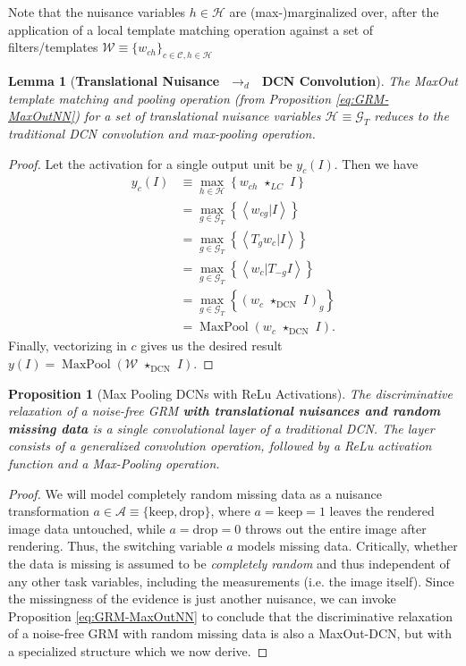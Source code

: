 \documentclass[12pt]{article}
\newtheorem{lemma}[theorem]{Lemma}
\newtheorem{proposition}[theorem]{Proposition}
\newcommand{\Cl}[0]{{ \mathcal{C} }}
\newcommand{\G}[0]{{ \mathcal{G} }}
\newcommand{\HH}[0]{{ \mathcal{H} }}
\newcommand{\A}[0]{{ \mathcal{A} }}
\newcommand{\W}[0]{{ \mathcal{W} }}
\newcommand{\drelax}[0]{{ \,\,\rightarrow_{d}\,\, }}
\newcommand{\lcmatch}[0]{{ \,\,\star_{LC}\,\, }}
\newcommand{\cnnconv}[0]{{ \,\,\star_{\textrm{DCN}}\,\, }}
\DeclareMathOperator*{\MaxPool}{MaxPool}
\begin{document}
Note that the nuisance variables $h \in \HH$ are (max-)marginalized over, after the application of a local template matching operation against a set of filters/templates $\W \equiv \{ w_{ch} \}_{c \in \Cl, h \in \HH}$\begin{lemma}[\textbf{Translational Nuisance $\drelax$ DCN Convolution}] 
\label{lem:trans-to-dcn-conv}
 The MaxOut template matching and pooling operation (from Proposition \ref{eq:GRM-MaxOutNN}) for a set of translational nuisance variables $\HH \equiv \G_{T}$ reduces to the traditional DCN convolution and max-pooling operation.
\end{lemma}\begin{proof}
 Let the activation for a single output unit be $y_{c}(I)$. Then we have
 \begin{align*} 
    y_{c}(I) &\equiv  \max_{h \in \HH}  \left\{ w_{ch} \lcmatch I \right\}   \\
                &=  \max_{g \in \G_{T}}  \left\{ \left< w_{cg} | I \right> \right\}  \\
                &=  \max_{g \in \G_{T}}  \left\{ \left< T_{g} w_{c} | I \right> \right\}  \\
                &=  \max_{g \in \G_{T}}  \left\{ \left< w_{c} | T_{-g} I \right> \right\}  \\
                &=  \max_{g \in \G_{T}}  \left\{ (w_{c} \cnnconv I)_{g} \right\}  \\
                &=  \MaxPool( w_{c} \cnnconv I).
 \end{align*}
 Finally, vectorizing in $c$ gives us the desired result $y(I) = \MaxPool( \W \cnnconv I)$.
\end{proof}\begin{proposition}[Max Pooling DCNs with ReLu Activations] \label{prop:detailedReLuProof}
The discriminative relaxation of a noise-free GRM \textbf{with translational nuisances and random missing data} is a single convolutional layer of a traditional DCN. The layer consists of a generalized convolution operation, followed by a ReLu activation function and a Max-Pooling operation.
\end{proposition}\begin{proof}
We will model completely random missing data as a nuisance transformation $a \in \A \equiv \{\textrm{keep}, \textrm{drop} \}$, where $a=\textrm{keep}=1$ leaves the rendered image data untouched, while $a=\textrm{drop}=0$ throws out the entire image after rendering. Thus, the switching variable $a$ models missing data. Critically, whether the data is missing is assumed to be \textit{completely random}  and thus independent of any other task variables, including the measurements (i.e. the image itself). Since the missingness of the evidence is just another nuisance, we can invoke Proposition \ref{eq:GRM-MaxOutNN} to conclude that the discriminative relaxation of a noise-free GRM with random missing data is also a MaxOut-DCN, but with a specialized structure which we now derive.


\end{proof}
\end{document}
